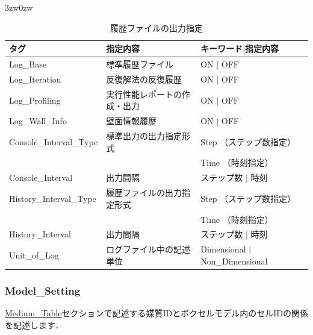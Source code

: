 \begin{indentation}{3zw}{0zw}
\begin{table}[htdp]
\caption{履歴ファイルの出力指定}
\begin{center}
\small
\begin{tabular}{lll} \toprule
タグ & 指定内容 & キーワード$|$指定内容\\ \midrule
Log\_Base & 標準履歴ファイル & ON $|$ OFF\\
Log\_Iteration & 反復解法の反復履歴 & ON $|$ OFF\\
Log\_Profiling & 実行性能レポートの作成・出力 & ON $|$ OFF\\
Log\_Wall\_Info & 壁面情報履歴 & ON $|$ OFF\\ \hline
Console\_Interval\_Type & 標準出力の出力指定形式 & Step （ステップ数指定）\\
& & Time （時刻指定）\\
Console\_Interval & 出力間隔 & ステップ数 $|$ 時刻\\ \hline
History\_Interval\_Type & 履歴ファイルの出力指定形式 & Step （ステップ数指定）\\
& & Time （時刻指定）\\
History\_Interval & 出力間隔 & ステップ数 $|$ 時刻\\ \hline
Unit\_of\_Log & ログファイル中の記述単位 & Dimensional $|$ Non\_Dimensional\\\bottomrule
\end{tabular}
\end{center}
\label{tbl:log_output}
\end{table}

\end{indentation}



\pagebreak
\subsubsection{Model\_Setting}

\hyperlink{tgt:medium_table}{Medium\_Table}セクションで記述する媒質IDとボクセルモデル内のセルIDの\hypertarget{tgt:model_setting}{関係を記述}します．

